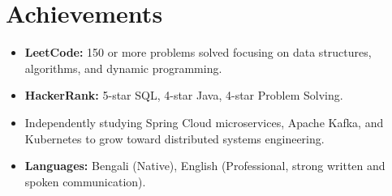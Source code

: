 \documentclass[a4paper,10.5pt]{article}
\begin{document}
\vspace{2pt}

\section{Achievements}
\vspace{2pt}

\begin{itemize}[noitemsep, topsep=0pt, leftmargin=1.3em, label={$\bullet$}]
  \item \textbf{LeetCode:} 150 or more problems solved focusing on data structures, algorithms, and dynamic programming.
  \item \textbf{HackerRank:} 5-star SQL, 4-star Java, 4-star Problem Solving.
  \item Independently studying Spring Cloud microservices, Apache Kafka, and Kubernetes to grow toward distributed systems engineering.
  \item \textbf{Languages:} Bengali (Native), English (Professional, strong written and spoken communication).
\end{itemize}
\end{document}
